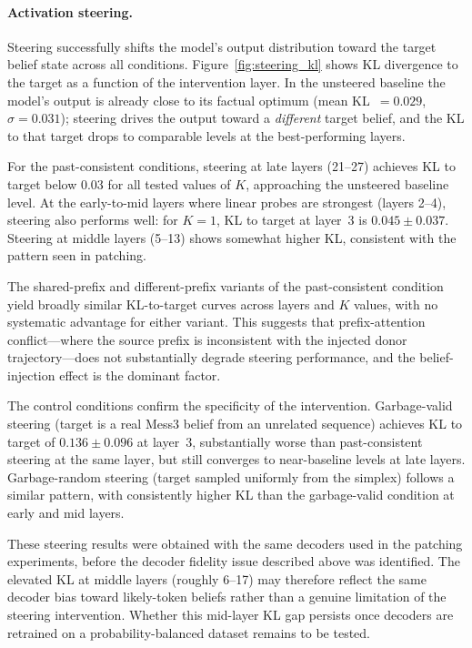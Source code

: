 \documentclass[midterm]{sparreport}
\begin{document}
\paragraph{Activation steering.}
Steering successfully shifts the model's output distribution toward the target belief state across all conditions. Figure~\ref{fig:steering_kl} shows KL divergence to the target as a function of the intervention layer. In the unsteered baseline the model's output is already close to its factual optimum (mean KL~$= 0.029$, $\sigma = 0.031$); steering drives the output toward a \emph{different} target belief, and the KL to that target drops to comparable levels at the best-performing layers.

For the past-consistent conditions, steering at late layers (21--27) achieves KL to target below 0.03 for all tested values of $K$, approaching the unsteered baseline level. At the early-to-mid layers where linear probes are strongest (layers 2--4), steering also performs well: for $K = 1$, KL to target at layer~3 is $0.045 \pm 0.037$. Steering at middle layers (5--13) shows somewhat higher KL, consistent with the pattern seen in patching.

The shared-prefix and different-prefix variants of the past-consistent condition yield broadly similar KL-to-target curves across layers and $K$ values, with no systematic advantage for either variant. This suggests that prefix-attention conflict---where the source prefix is inconsistent with the injected donor trajectory---does not substantially degrade steering performance, and the belief-injection effect is the dominant factor.

The control conditions confirm the specificity of the intervention. Garbage-valid steering (target is a real Mess3 belief from an unrelated sequence) achieves KL to target of $0.136 \pm 0.096$ at layer~3, substantially worse than past-consistent steering at the same layer, but still converges to near-baseline levels at late layers. Garbage-random steering (target sampled uniformly from the simplex) follows a similar pattern, with consistently higher KL than the garbage-valid condition at early and mid layers.

These steering results were obtained with the same decoders used in the patching experiments, before the decoder fidelity issue described above was identified. The elevated KL at middle layers (roughly 6--17) may therefore reflect the same decoder bias toward likely-token beliefs rather than a genuine limitation of the steering intervention. Whether this mid-layer KL gap persists once decoders are retrained on a probability-balanced dataset remains to be tested.
\end{document}

